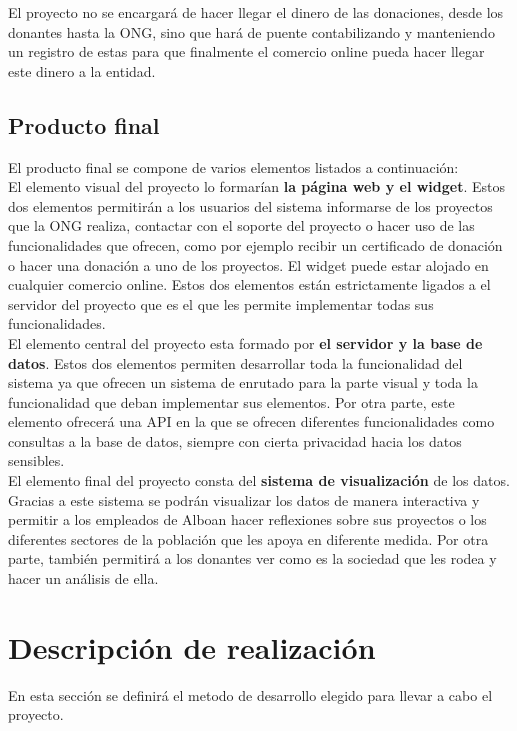 El proyecto no se encargará de hacer llegar el dinero de las donaciones, desde los donantes hasta la ONG, sino que hará de puente contabilizando y manteniendo un registro de estas para que finalmente el comercio online pueda hacer llegar este dinero a la entidad.

\subsection{Producto final}
El producto final se compone de varios elementos listados a continuación:\\

El elemento visual del proyecto lo formarían \textbf{la página web y el widget}. Estos dos elementos permitirán a los usuarios del sistema informarse de los proyectos que la ONG realiza, contactar con el soporte del proyecto o hacer uso de las funcionalidades que ofrecen, como por ejemplo recibir un certificado de donación o hacer una donación a uno de los proyectos. El widget puede estar alojado en cualquier comercio online. Estos dos elementos están estrictamente ligados a el servidor del proyecto que es el que les permite implementar todas sus funcionalidades.\\

El elemento central del proyecto esta formado por \textbf{el servidor y la base de datos}. Estos dos elementos permiten desarrollar toda la funcionalidad del sistema ya que ofrecen un sistema de enrutado para la parte visual y toda la funcionalidad que deban implementar sus elementos. Por otra parte, este elemento ofrecerá una API en la que se ofrecen diferentes funcionalidades como consultas a la base de datos, siempre con cierta privacidad hacia los datos sensibles.\\

El elemento final del proyecto consta del \textbf{sistema de visualización} de los datos. Gracias a este sistema se podrán visualizar los datos de manera interactiva y permitir a los empleados de Alboan hacer reflexiones sobre sus proyectos o los diferentes sectores de la población que les apoya en diferente medida. Por otra parte, también permitirá a los donantes ver como es la sociedad que les rodea y hacer un análisis de ella.

\section{Descripción de realización}
En esta sección se definirá el metodo de desarrollo elegido para llevar a cabo el proyecto.
